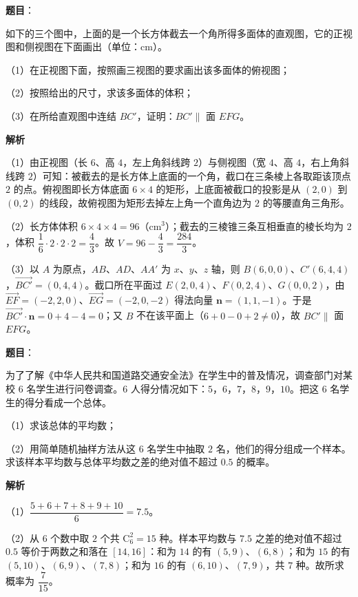 \begin{answer}

\textbf{题目}：

如下的三个图中，上面的是一个长方体截去一个角所得多面体的直观图，它的正视图和侧视图在下面画出（单位：cm）。

（1）在正视图下面，按照画三视图的要求画出该多面体的俯视图；

（2）按照给出的尺寸，求该多面体的体积；

（3）在所给直观图中连结 $BC'$，证明：$BC'\parallel$ 面 $EFG$。
\nopagebreak[4]
\begin{center}\end{center}
\nopagebreak[4]
\textbf{解析}

（1）由正视图（长 $6$、高 $4$，左上角斜线跨 $2$）与侧视图（宽 $4$、高 $4$，右上角斜线跨 $2$）可知：被截去的是长方体上底面的一个角，截口在三条棱上各取距该顶点 $2$ 的点。俯视图即长方体底面 $6\times4$ 的矩形，上底面被截口的投影是从 $(2,0)$ 到 $(0,2)$ 的线段，故俯视图为矩形去掉左上角一个直角边为 $2$ 的等腰直角三角形。

（2）长方体体积 $6\times4\times4=96$（$\mathrm{cm^3}$）；截去的三棱锥三条互相垂直的棱长均为 $2$，体积 $\dfrac16\cdot2\cdot2\cdot2=\dfrac43$。故 $V=96-\dfrac43=\dfrac{284}3$。

（3）以 $A$ 为原点，$AB$、$AD$、$AA'$ 为 $x$、$y$、$z$ 轴，则 $B(6,0,0)$、$C'(6,4,4)$，$\overrightarrow{BC'}=(0,4,4)$。截口所在平面过 $E(2,0,4)$、$F(0,2,4)$、$G(0,0,2)$，由 $\overrightarrow{EF}=(-2,2,0)$、$\overrightarrow{EG}=(-2,0,-2)$ 得法向量 $\boldsymbol n=(1,1,-1)$。于是 $\overrightarrow{BC'}\cdot\boldsymbol n=0+4-4=0$；又 $B$ 不在该平面上（$6+0-0+2\neq0$），故 $BC'\parallel$ 面 $EFG$。


\end{answer}
\begin{answer}

\textbf{题目}：

为了了解《中华人民共和国道路交通安全法》在学生中的普及情况，调查部门对某校 $6$ 名学生进行问卷调查。$6$ 人得分情况如下：$5$，$6$，$7$，$8$，$9$，$10$。把这 $6$ 名学生的得分看成一个总体。

（1）求该总体的平均数；

（2）用简单随机抽样方法从这 $6$ 名学生中抽取 $2$ 名，他们的得分组成一个样本。求该样本平均数与总体平均数之差的绝对值不超过 $0.5$ 的概率。

\textbf{解析}

（1）$\dfrac{5+6+7+8+9+10}6=7.5$。

（2）从 $6$ 个数中取 $2$ 个共 $\mathrm C_6^2=15$ 种。样本平均数与 $7.5$ 之差的绝对值不超过 $0.5$ 等价于两数之和落在 $[14,16]$：和为 $14$ 的有 $(5,9)$、$(6,8)$；和为 $15$ 的有 $(5,10)$、$(6,9)$、$(7,8)$；和为 $16$ 的有 $(6,10)$、$(7,9)$，共 $7$ 种。故所求概率为 $\dfrac7{15}$。


\end{answer}
